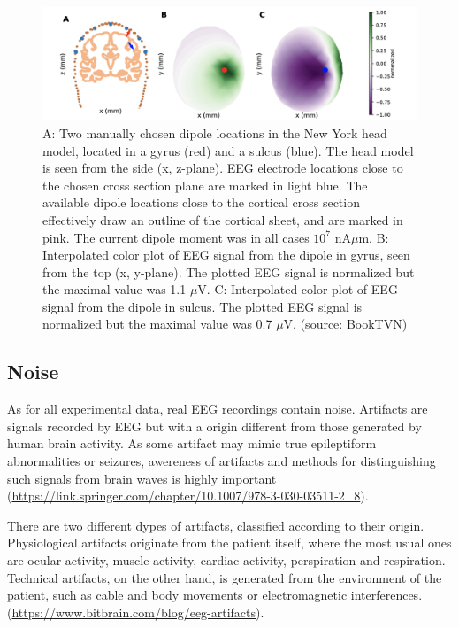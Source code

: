 \documentclass[a4paper, UKenglish, 11pt]{uiomaster}
\begin{document}
\begin{figure}[!htb]
    \centering
    \includegraphics[width=\linewidth]{figures/gyrus_and_sulcus_EEG.png}
    \caption{A: Two manually chosen dipole locations in the New York head model, located in a gyrus (red) and a sulcus (blue). The head model is seen from the side (x, z-plane). EEG electrode locations close to the chosen cross section plane are marked in light blue. The available dipole locations close to the cortical cross section effectively draw an outline of the cortical sheet, and are marked in pink. The current dipole moment was in all cases $10^7$ nA$\mu$m. B: Interpolated color plot of EEG signal from the dipole in gyrus, seen from the top (x, y-plane). The plotted EEG signal is normalized but the maximal value was 1.1 $\mu$V. C: Interpolated color plot of EEG signal from the dipole in sulcus. The plotted EEG signal is normalized but the maximal value was 0.7 $\mu$V. (source: BookTVN)}
    \label{fig:gyrus_and_sulcus_EEG}
\end{figure}


\subsection{Noise}
As for all experimental data, real EEG recordings contain noise. Artifacts are signals recorded by EEG but with a origin different from those generated by human brain activity. As some artifact may mimic true epileptiform abnormalities or seizures, awereness of artifacts and methods for distinguishing such signals from brain waves is highly important (\url{https://link.springer.com/chapter/10.1007/978-3-030-03511-2_8}).

There are two different dypes of artifacts, classified according to their origin. Physiological artifacts originate from the patient itself, where the most usual ones are ocular activity, muscle activity, cardiac activity, perspiration and respiration. Technical artifacts, on the other hand, is generated from the environment of the patient, such as cable and body movements or electromagnetic interferences. (\url{https://www.bitbrain.com/blog/eeg-artifacts}).
\end{document}
